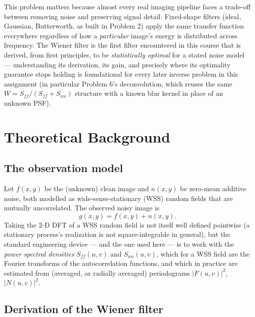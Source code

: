 \documentclass[11pt]{article}
\begin{document}
This problem matters because almost every real imaging pipeline faces a trade-off between
removing noise and preserving signal detail. Fixed-shape filters (ideal, Gaussian, Butterworth,
as built in Problem 2) apply the same transfer function everywhere regardless of how a
\emph{particular} image's energy is distributed across frequency. The Wiener filter is the
first filter encountered in this course that is derived, from first principles, to be
\emph{statistically optimal} for a stated noise model — understanding its derivation, its gain,
and precisely where its optimality guarantee stops holding is foundational for every later
inverse problem in this assignment (in particular Problem 6's deconvolution, which reuses the
same $W=S_{ff}/(S_{ff}+S_{nn})$ structure with a known blur kernel in place of an unknown PSF).

\section{Theoretical Background}

\subsection{The observation model}

Let $f(x,y)$ be the (unknown) clean image and $n(x,y)$ be zero-mean additive noise, both
modelled as wide-sense-stationary (WSS) random fields that are mutually uncorrelated. The
observed noisy image is
\[
g(x,y) = f(x,y) + n(x,y).
\]
Taking the 2-D DFT of a WSS random field is not itself well defined pointwise (a stationary
process's realization is not square-integrable in general), but the standard engineering
device — and the one used here — is to work with the \emph{power spectral densities}
$S_{ff}(u,v)$ and $S_{nn}(u,v)$, which for a WSS field are the Fourier transforms of the
autocorrelation functions, and which in practice are estimated from (averaged, or radially
averaged) periodograms $|F(u,v)|^2$, $|N(u,v)|^2$.

\subsection{Derivation of the Wiener filter}
\end{document}
